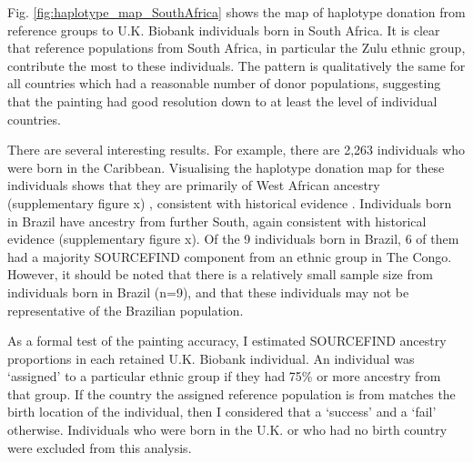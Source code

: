 Fig. \ref{fig:haplotype_map_SouthAfrica} shows the map of haplotype donation from reference groups to U.K. Biobank individuals born in South Africa. It is clear that reference populations from South Africa, in particular the Zulu ethnic group, contribute the most to these individuals. The pattern is qualitatively the same for all countries which had a reasonable number of donor populations, suggesting that the painting had good resolution down to at least the level of individual countries.

There are several interesting results. For example, there are 2,263 individuals who were born in the Caribbean. Visualising the haplotype donation map for these individuals shows that they are primarily of West African ancestry (supplementary figure x) , consistent with historical evidence \cite{micheletti2020genetic}. Individuals born in Brazil have ancestry from further South, again consistent with historical evidence (supplementary figure x). Of the 9 individuals born in Brazil, 6 of them had a majority SOURCEFIND component from an ethnic group in The Congo. However, it should be noted that there is a relatively small sample size from individuals born in Brazil (n=9), and that these individuals may not be representative of the Brazilian population. 

As a formal test of the painting accuracy, I estimated SOURCEFIND ancestry proportions in each retained U.K. Biobank individual. An individual was `assigned' to a particular ethnic group if they had 75\% or more ancestry from that group. If the country the assigned reference population is from matches the birth location of the individual, then I considered that a `success' and a `fail' otherwise. Individuals who were born in the U.K. or who had no birth country were excluded from this analysis. 

